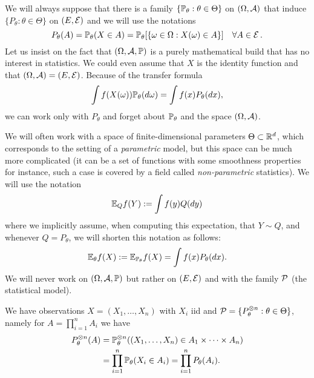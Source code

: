 We will always suppose that there is a family $\{ \P_\theta : \theta \in \Theta\}$ on $(\Omega, \cA)$ that induce $\{ P_\theta : \theta \in \Theta\}$ on $(E, \cE)$ and we will use the notations
\begin{equation*}
	P_\theta(A) = \P_\theta(X \in A) = \P_\theta[ \{ \omega \in \Omega : X(\omega) \in A \}] \quad \forall A \in \cE.
\end{equation*}
Let us insist on the fact that $(\Omega, \cA, \P)$ is a purely mathematical build that has no interest in statistics.
We could even assume that $X$ is the identity function and that $(\Omega, \cA) = (E, \cE)$.
Because of the transfer formula
\begin{equation*}
	\int f(X(\omega)) \P_\theta(d \omega) = \int f(x) P_\theta(dx),
\end{equation*}
we can work only with $P_\theta$ and forget about $\P_\theta$ and the space $(\Omega, \cA)$.

We will often work with a space of finite-dimensional parameters $\Theta \subset \R^d$, which corresponds to the setting  of a \emph{parametric} model, but this space can be much more complicated (it can be a set of functions with some smoothness properties for instance, such a case is covered by a field called \emph{non-parametric} statistics).
We will use the notation
\begin{equation*}
	\E_Q f(Y) := \int f(y) Q(dy)
\end{equation*}
where we implicitly assume, when computing this expectation, that $Y \sim Q$, and whenever $Q = P_\theta$, we will shorten this notation as follows:
\begin{equation*}
	\E_\theta f(X) := \E_{\P_\theta} f(X) = \int f(x) P_\theta(dx).
\end{equation*}
We will never work on $(\Omega, \cA, \P)$ but rather on $(E, \cE)$ and with the family $\cP$ (the statistical model).
\begin{definition}
We have observations $X = (X_1, \ldots, X_n)$ with $X_i$ iid and $\cP = \{ P_\theta^{\otimes n} : \theta \in \Theta\}$, namely for $A = \prod_{i=1}^n A_i$ we have
\begin{align*}
	P_\theta^{\otimes n}(A) &= \P_\theta^{\otimes n}( (X_1, \ldots, X_n) \in A_1 \times \cdots \times A_n) \\
	&= \prod_{i=1}^n \P_\theta(X_i \in A_i) = \prod_{i=1}^n P_\theta(A_i).
\end{align*}
\end{definition}

